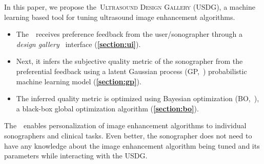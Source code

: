 In this paper, we propose the~\textsc{Ultrasound Design Gallery} (USDG), a machine learning based tool for tuning ultrasound image enhancement algorithms.
\begin{itemize}
    \item[\ding{228}] The~\usdg~receives preference feedback from the user/sonographer through a \textit{design gallery}~\cite{brochu_bayesian_2010, 10.1145/3072959.3073598, koyama_sequential_2020, phan_color_2018, pmlr-v119-mikkola20a} interface (\textbf{\cref{section:ui}}).
    \vspace{0.02in}
  \item[\ding{228}] Next, it infers the subjective quality metric of the sonographer from the preferential feedback using a latent Gaussian process (GP,~\cite{rasmussen_gaussian_2006, pmlr-v119-mikkola20a}) probabilistic machine learning model (\textbf{\cref{section:gp}}).
    \vspace{0.02in}
  \item[\ding{228}] The inferred quality metric is optimized using Bayesian optimization (BO,~\cite{shahriari_taking_2016}), a black-box global optimization algorithm (\textbf{\cref{section:bo}}).
\end{itemize}
The~\usdg~enables personalization of image enhancement algorithms to individual sonographers and clinical tasks.
Even better, the sonographer does not need to have any knowledge about the image enhancement algorithm being tuned and its parameters while interacting with the USDG.



